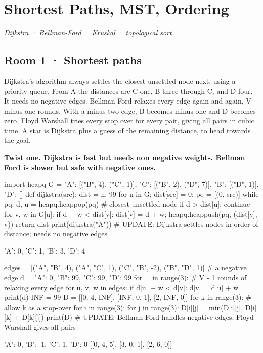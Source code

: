 \documentclass[11pt,a4paper]{report}
\begin{document}
\chapter{Shortest Paths, MST, Ordering}
\textit{Dijkstra · Bellman-Ford · Kruskal · topological sort}
\section*{Room 1 · Shortest paths}
Dijkstra's algorithm always settles the closest unsettled node next, using a priority queue. From A the distances are C one, B three through C, and D four. It needs no negative edges. Bellman Ford relaxes every edge again and again, V minus one rounds. With a minus two edge, B becomes minus one and D becomes zero. Floyd Warshall tries every stop over for every pair, giving all pairs in cubic time. A star is Dijkstra plus a guess of the remaining distance, to head towards the goal.
\begin{tcolorbox}[colback=yellow!12,colframe=orange!70!black,boxrule=0.4pt,left=4pt,right=4pt,top=2pt,bottom=2pt]\textbf{Twist one. Dijkstra is fast but needs non negative weights. Bellman Ford is slower but safe with negative ones.}\end{tcolorbox}
\begin{Code}
import heapq
G = {"A": [("B", 4), ("C", 1)], "C": [("B", 2), ("D", 7)], "B": [("D", 1)], "D": []}
def dijkstra(src):
    dist = {n: 99 for n in G}; dist[src] = 0; pq = [(0, src)]
    while pq:
        d, u = heapq.heappop(pq)            # closest unsettled node
        if d > dist[u]: continue
        for v, w in G[u]:
            if d + w < dist[v]: dist[v] = d + w; heapq.heappush(pq, (dist[v], v))
    return dist
print(dijkstra("A"))
# UPDATE: Dijkstra settles nodes in order of distance; needs no negative edges
\end{Code}
\begin{Out}
{'A': 0, 'C': 1, 'B': 3, 'D': 4}
\end{Out}
\begin{Code}
edges = [("A", "B", 4), ("A", "C", 1), ("C", "B", -2), ("B", "D", 1)]   # a negative edge
d = {"A": 0, "B": 99, "C": 99, "D": 99}
for _ in range(3):                          # V - 1 rounds of relaxing every edge
    for u, v, w in edges:
        if d[u] + w < d[v]: d[v] = d[u] + w
print(d)
INF = 99
D = [[0, 4, INF], [INF, 0, 1], [2, INF, 0]]
for k in range(3):                          # allow k as a stop-over
    for i in range(3):
        for j in range(3): D[i][j] = min(D[i][j], D[i][k] + D[k][j])
print(D)
# UPDATE: Bellman-Ford handles negative edges; Floyd-Warshall gives all pairs
\end{Code}
\begin{Out}
{'A': 0, 'B': -1, 'C': 1, 'D': 0}
[[0, 4, 5], [3, 0, 1], [2, 6, 0]]
\end{Out}
\end{document}
